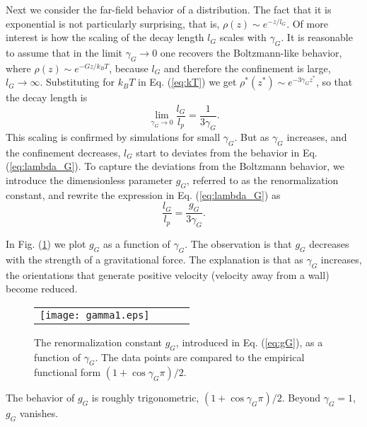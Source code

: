 \documentclass[pre,twocolumn,graphicx]{revtex4-1}
\newcommand{\be}{\begin{equation}}
\newcommand{\ee}{\end{equation}}
\begin{document}
Next we consider the far-field behavior of a distribution.  The fact that it is exponential is
not particularly surprising, that is, $\rho(z)\sim e^{-z/l_G}$.  Of more interest is how the scaling 
of the decay length $l_G$ scales with $\gamma_G$.  It is reasonable to assume that in the limit 
$\gamma_G\to 0$ one recovers the Boltzmann-like behavior, where $\rho(z)\sim e^{-G z/k_BT}$,
because $l_G$ and therefore the confinement is large, $l_G\to\infty$.  
Substituting 
for $k_BT$ in Eq. (\ref{eq:kT}) we get $\rho^*(z^*) \sim e^{- 3\gamma_G z^*}$, so that the decay 
length is 
\be
\lim_{\gamma_G\to 0}\frac{l_G}{l_p} = \frac{1}{3\gamma_G}.  
\label{eq:lambda_G}
\ee
This scaling is confirmed by simulations for small $\gamma_G$.  But as $\gamma_G$ increases, 
and the confinement decreases, 
$l_G$ start to deviates from the behavior in Eq. (\ref{eq:lambda_G}).  To capture the deviations
from the Boltzmann behavior, we introduce the dimensionless parameter $g_G$, referred to as the 
renormalization constant, and rewrite the expression in Eq. (\ref{eq:lambda_G}) as 
\be
\frac{l_G}{l_p} = \frac{g_G}{3\gamma_G}.  
\label{eq:gG}
\ee

In Fig. (\ref{fig:gG}) we plot $g_G$ as a function of $\gamma_G$.  
The observation is that $g_G$ decreases with the strength of a gravitational force.  The
explanation is that as $\gamma_G$ increases, the 
orientations that generate positive velocity (velocity away from a wall) become reduced.  
\graphicspath{{figures/}}
\begin{figure}[h] 
 \begin{center}
 \begin{tabular}{rrrr}
  \texttt{[image: gamma1.eps]}&
 \end{tabular}
 \end{center}
\caption{The renormalization constant $g_G$, introduced in Eq. (\ref{eq:gG}), as a function of  
$\gamma_G$.  The data points are compared to the empirical functional form 
$(1+\cos\gamma_G\pi)/2$.  } 
\label{fig:gG} 
\end{figure}
The behavior of $g_G$ is roughly trigonometric, $(1+\cos\gamma_G\pi)/2$.  Beyond $\gamma_G= 1$, $g_G$ 
vanishes.  
\end{document}
